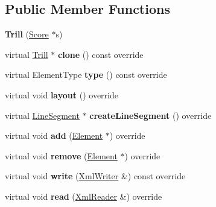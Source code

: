 \subsection*{Public Member Functions}
\begin{DoxyCompactItemize}
\item 
\mbox{\label{class_ms_1_1_trill_acc8061f826cdd74b3d9535cdb726e76c}} 
{\bfseries Trill} (\hyperlink{class_ms_1_1_score}{Score} $\ast$s)
\item 
\mbox{\label{class_ms_1_1_trill_a69bd5b5908cfa347c56f2d35e5ddbeec}} 
virtual \hyperlink{class_ms_1_1_trill}{Trill} $\ast$ {\bfseries clone} () const override
\item 
\mbox{\label{class_ms_1_1_trill_a3e6acec79947799d6af331f72ec8f828}} 
virtual Element\+Type {\bfseries type} () const override
\item 
\mbox{\label{class_ms_1_1_trill_adb412f508035fa5c0b0da95df4424418}} 
virtual void {\bfseries layout} () override
\item 
\mbox{\label{class_ms_1_1_trill_acef70e40359fd40e728104308826e21f}} 
virtual \hyperlink{class_ms_1_1_line_segment}{Line\+Segment} $\ast$ {\bfseries create\+Line\+Segment} () override
\item 
\mbox{\label{class_ms_1_1_trill_a61a800f0cd27ff3cfbb905f8fd182f30}} 
virtual void {\bfseries add} (\hyperlink{class_ms_1_1_element}{Element} $\ast$) override
\item 
\mbox{\label{class_ms_1_1_trill_aa96acc15233c1f9c92a120dfb003af91}} 
virtual void {\bfseries remove} (\hyperlink{class_ms_1_1_element}{Element} $\ast$) override
\item 
\mbox{\label{class_ms_1_1_trill_a2e18b640c3f88dd6dcd0fdbc83609415}} 
virtual void {\bfseries write} (\hyperlink{class_ms_1_1_xml_writer}{Xml\+Writer} \&) const override
\item 
\mbox{\label{class_ms_1_1_trill_ab4fb0f2412d68ff88ddf616afcec8eab}} 
virtual void {\bfseries read} (\hyperlink{class_ms_1_1_xml_reader}{Xml\+Reader} \&) override

\end{DoxyCompactItemize}
